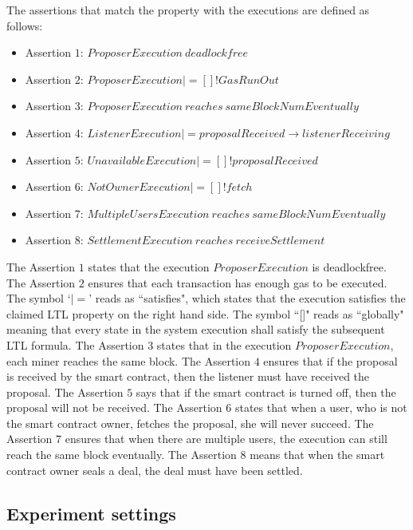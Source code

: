 \documentclass{KERauth}
\begin{document}
The assertions that match the property with the executions are defined as follows:
\begin{itemize}
    \item Assertion $1$: $ProposerExecution\ deadlockfree$
    \item Assertion $2$: $ProposerExecution |= []! GasRunOut$
    \item Assertion $3$: $ProposerExecution\ reaches\  sameBlockNumEventually$
    \item Assertion $4$: $ListenerExecution |= proposalReceived \rightarrow listenerReceiving$
    \item Assertion $5$: $UnavailableExecution |= []! proposalReceived$
    \item Assertion $6$: $NotOwnerExecution |= []! fetch$
    \item Assertion $7$: $MultipleUsersExecution\ reaches\ sameBlockNumEventually$
    \item Assertion $8$: $SettlementExecution\ reaches\ receiveSettlement$
\end{itemize}

The Assertion $1$ states that the execution $ProposerExecution$ is deadlockfree. The Assertion $2$ ensures that each transaction has enough gas to be executed. The symbol `$|=$' reads as ``satisfies", which states that the execution satisfies the claimed LTL property on the right hand side. The symbol ``[]" reads as ``globally" meaning that every state in the system execution shall satisfy the subsequent LTL formula. The Assertion $3$ states that in the execution $ProposerExecution$, each miner reaches the same block. The Assertion $4$ ensures that if the proposal is received by the smart contract, then the listener must have received the proposal. The Assertion $5$ says that if the smart contract is turned off, then the proposal will not be received. The Assertion $6$ states that when a user, who is not the smart contract owner, fetches the proposal, she will never succeed. The Assertion $7$ ensures that when there are multiple users, the execution can still reach the same block eventually. The Assertion $8$ means that when the smart contract owner seals a deal, the deal must have been settled. 


\subsection{Experiment settings}
\end{document}
